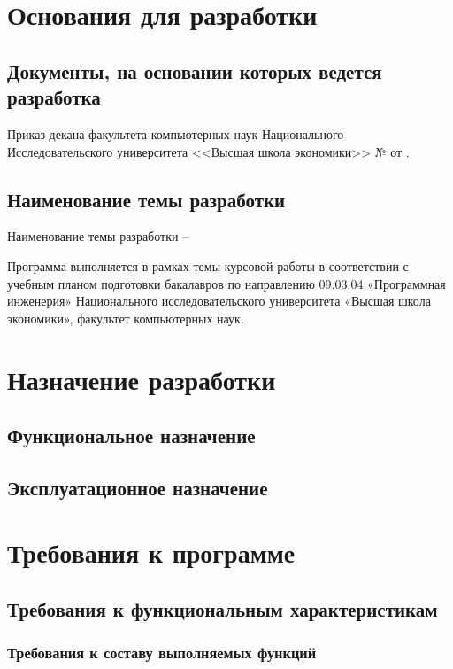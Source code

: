 \documentclass[a4paper,12pt,reqno]{article}
\begin{document}
	\newpage
	\section{Основания для разработки}
	\subsection{Документы, на основании которых ведется разработка}
	
	
	Приказ декана факультета компьютерных наук Национального Исследовательского университета <<Высшая школа экономики>> № {\color{red}{TODO}} от {\color{red}{TODO}}.
	
	\subsection{Наименование темы разработки}
	
	Наименование темы разработки – {\color{red}{TODO}}


 Программа выполняется в рамках темы курсовой работы в соответствии с учебным планом подготовки бакалавров по направлению 09.03.04 «Программная инженерия» Национального исследовательского университета «Высшая школа экономики», факультет компьютерных наук.
	
	\newpage 
	\section{Назначение разработки}
	 
	\subsection{Функциональное назначение}
	{\color{red}{TODO}}
	\subsection{Эксплуатационное назначение}
	{\color{red}{TODO}}
	
						\newpage
	\section{Требования к программе}
	\subsection{Требования к функциональным характеристикам}
	\subsubsection{Требования к составу выполняемых функций}
	
\end{document}
